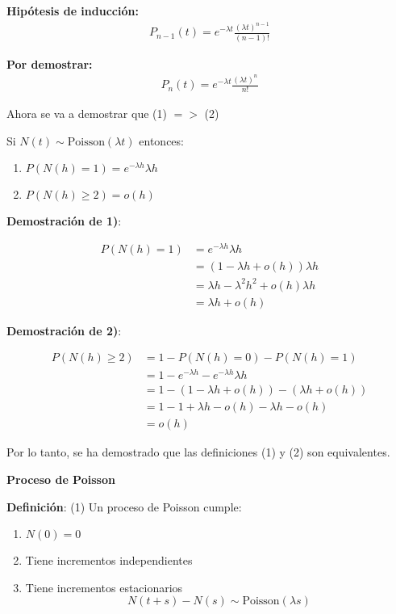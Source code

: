 \documentclass[12pt,a4paper]{article}
\newcommand{\definicion}[1]{%
\begin{definicionbox}
\textbf{Definición}: #1
\end{definicionbox}
}
\begin{document}
\textbf{Hipótesis de inducción:}
\begin{align*}
P_{n-1}(t) = e^{-\lambda t} \frac{(\lambda t)^{n-1}}{(n-1)!}
\end{align*}

\textbf{Por demostrar:}
\begin{align*}
P_n(t) = e^{-\lambda t} \frac{(\lambda t)^n}{n!}
\end{align*}

Ahora se va a demostrar que (1) $= >$ (2)

Si $N(t) \sim \text{Poisson}(\lambda t)$ entonces:

\begin{enumerate}
    \item $P(N(h)=1) = e^{-\lambda h} \lambda h$
    \item $P(N(h) \geq 2) = o(h)$
\end{enumerate}

\textbf{Demostración de 1)}:

\begin{align*}
P(N(h)=1) &= e^{-\lambda h} \lambda h \\
&= (1 - \lambda h + o(h)) \lambda h \\
&= \lambda h - \lambda^2 h^2 + o(h) \lambda h \\
&= \lambda h + o(h)
\end{align*}

\textbf{Demostración de 2)}:

\begin{align*}
P(N(h) \geq 2) &= 1 - P(N(h)=0) - P(N(h)=1) \\
&= 1 - e^{-\lambda h} - e^{-\lambda h} \lambda h \\
&= 1 - (1 - \lambda h + o(h)) - (\lambda h + o(h)) \\
&= 1 - 1 + \lambda h - o(h) - \lambda h - o(h) \\
&= o(h)
\end{align*}

Por lo tanto, se ha demostrado que las definiciones (1) y (2) son equivalentes.


\textbf{Proceso de Poisson}

\definicion{
(1) Un proceso de Poisson cumple:
\begin{enumerate}
    \item $N(0) = 0$
    \item Tiene incrementos independientes
    \item Tiene incrementos estacionarios
    \begin{equation*}
    N(t+s) - N(s) \sim \text{Poisson}(\lambda s)
    \end{equation*}
\end{enumerate}
}
\end{document}
